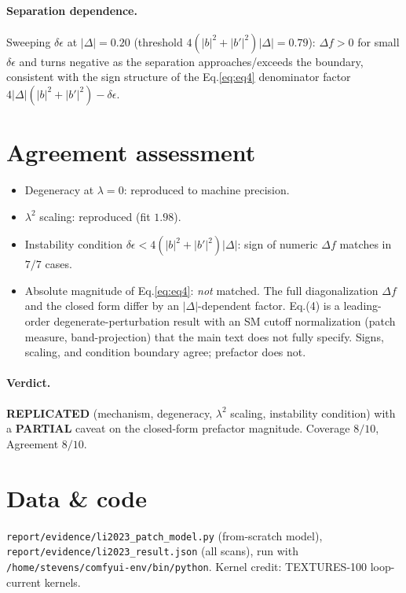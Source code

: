 \documentclass[11pt]{article}
\begin{document}
\paragraph{Separation dependence.} Sweeping $\delta\epsilon$ at $|\Delta|=0.20$
(threshold $4(|b|^2+|b'|^2)|\Delta|=0.79$): $\Delta f>0$ for small $\delta\epsilon$
and turns negative as the separation approaches/exceeds the boundary, consistent
with the sign structure of the Eq.\eqref{eq:eq4} denominator factor
$4|\Delta|(|b|^2+|b'|^2)-\delta\epsilon$.

\section{Agreement assessment}
\begin{itemize}
\item Degeneracy at $\lambda=0$: reproduced to machine precision.
\item $\lambda^2$ scaling: reproduced (fit $1.98$).
\item Instability condition $\delta\epsilon<4(|b|^2+|b'|^2)|\Delta|$: sign of
numeric $\Delta f$ matches in $7/7$ cases.
\item Absolute magnitude of Eq.\eqref{eq:eq4}: \emph{not} matched. The full
diagonalization $\Delta f$ and the closed form differ by an
$|\Delta|$-dependent factor. Eq.(4) is a leading-order degenerate-perturbation
result with an SM cutoff normalization (patch measure, band-projection) that the
main text does not fully specify. Signs, scaling, and condition boundary agree;
prefactor does not.
\end{itemize}

\paragraph{Verdict.} \textbf{REPLICATED} (mechanism, degeneracy, $\lambda^2$
scaling, instability condition) with a \textbf{PARTIAL} caveat on the closed-form
prefactor magnitude. Coverage $8/10$, Agreement $8/10$.

\section*{Data \& code}
\texttt{report/evidence/li2023\_patch\_model.py} (from-scratch model),
\texttt{report/evidence/li2023\_result.json} (all scans), run with
\texttt{/home/stevens/comfyui-env/bin/python}. Kernel credit:
TEXTURES-100 loop-current kernels.
\end{document}
